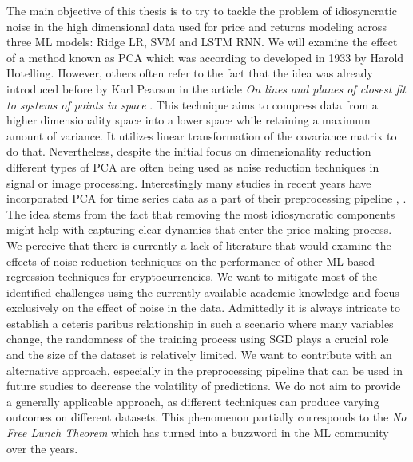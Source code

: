 The main objective of this thesis is to try to tackle the problem of idiosyncratic noise in
the high dimensional data used for price and returns modeling across three ML models: Ridge \ac{LR}, \ac{SVM}
and \ac{LSTM} \ac{RNN}.
We will examine the effect of a method known as \ac{PCA} which was according to 
\cite{Farebrother2022} developed in 1933 by Harold Hotelling. However, others often refer
to the fact 
that the idea was already introduced before by Karl Pearson in the article 
\textit{On lines and planes of closest fit to systems of points in space} \cite{Pearson1901}.
This technique aims to compress data from a higher dimensionality space into a lower space while 
retaining a maximum amount of variance. It utilizes linear transformation of the covariance matrix
to do that.
Nevertheless, despite the initial focus on dimensionality reduction different types of 
\ac{PCA} are often being used as noise reduction techniques in signal or image processing.
Interestingly many studies in recent years have incorporated \ac{PCA} for time series data 
as a part of their preprocessing pipeline \cite{Chowdhury2018}, \cite{Kristjanpoller2018}.
The idea stems from the fact that removing the most idiosyncratic components
might help with capturing clear dynamics that enter the price-making process.
We perceive that there is currently a lack of literature that would examine the effects of 
noise reduction techniques on the performance of other \ac{ML} based regression techniques
for cryptocurrencies. We want to mitigate most of the identified challenges using 
the currently available academic knowledge and focus exclusively on the effect of noise in the data. 
Admittedly it is always intricate to establish a ceteris paribus relationship in such a scenario
where many variables change, the randomness of the training process using \ac{SGD} plays a crucial role 
and the size of the dataset is relatively limited. We want to contribute with an alternative approach, especially 
in the preprocessing pipeline that can be used in future studies to decrease the volatility of predictions.
We do not aim to provide a generally applicable approach, as different techniques 
can produce varying outcomes on different datasets.
This phenomenon partially corresponds to the \textit{No Free Lunch Theorem} \cite{Wolpert1995} which
has turned into a buzzword in the \ac{ML} community over the years.


